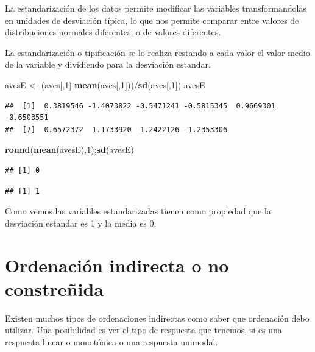 \documentclass[]{book}
\newenvironment{Shaded}{\begin{snugshade}}{\end{snugshade}}
\newcommand{\KeywordTok}[1]{\textcolor[rgb]{0.13,0.29,0.53}{\textbf{{#1}}}}
\newcommand{\DecValTok}[1]{\textcolor[rgb]{0.00,0.00,0.81}{{#1}}}
\newcommand{\StringTok}[1]{\textcolor[rgb]{0.31,0.60,0.02}{{#1}}}
\newcommand{\NormalTok}[1]{{#1}}
\begin{document}
La estandarización de los datos permite modificar las variables
transformandolas en unidades de desviación típica, lo que nos permite
comparar entre valores de distribuciones normales diferentes, o de
valores diferentes.

La estandarización o tipificación se lo realiza restando a cada valor el
valor medio de la variable y dividiendo para la desviación estandar.

\begin{Shaded}
\begin{Highlighting}[]
\NormalTok{avesE <-}\StringTok{ }\NormalTok{(aves[,}\DecValTok{1}\NormalTok{]-}\KeywordTok{mean}\NormalTok{(aves[,}\DecValTok{1}\NormalTok{]))/}\KeywordTok{sd}\NormalTok{(aves[,}\DecValTok{1}\NormalTok{])}
\NormalTok{avesE}
\end{Highlighting}
\end{Shaded}

\begin{verbatim}
##  [1]  0.3819546 -1.4073822 -0.5471241 -0.5815345  0.9669301 -0.6503551
##  [7]  0.6572372  1.1733920  1.2422126 -1.2353306
\end{verbatim}

\begin{Shaded}
\begin{Highlighting}[]
\KeywordTok{round}\NormalTok{(}\KeywordTok{mean}\NormalTok{(avesE),}\DecValTok{1}\NormalTok{);}\KeywordTok{sd}\NormalTok{(avesE) }
\end{Highlighting}
\end{Shaded}

\begin{verbatim}
## [1] 0
\end{verbatim}

\begin{verbatim}
## [1] 1
\end{verbatim}

Como vemos las variables estandarizadas tienen como propiedad que la
desviación estandar es 1 y la media es 0.

\section{Ordenación indirecta o no
constreñida}\label{ordenacion-indirecta-o-no-constrenida}

Existen muchos tipos de ordenaciones indirectas como saber que
ordenación debo utilizar. Una posibilidad es ver el tipo de respuesta
que tenemos, si es una respuesta linear o monotónica o una respuesta
unimodal.
\end{document}
